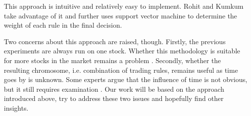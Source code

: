 \documentclass{article}
\begin{document}
This approach is intuitive and relatively easy to implement.
Rohit and Kumkum \cite{a-hybrid-machine-learning-system-for-stock-market-forecasting}
take advantage of it and further uses support vector machine
to determine the weight of each rule in the final decision.

Two concerns about this approach are raised, though.
Firstly, the previous experiments are always run on one stock.
Whether this methodology is suitable for more stocks in the market remains a problem
\cite{genetic-algorithms-for-predicting-the-egyptian-stock-market}.
Secondly, whether the resulting chromosome, i.e. combination of trading rules,
remains useful as time goes by is unknown.
Some experts argue that the influence of time is not obvious,
but it still requires examination
\cite{stock-timing-using-genetic-algorithms}.
Our work will be based on the approach introduced above,
try to address these two issues and hopefully find other insights.






\end{document}

